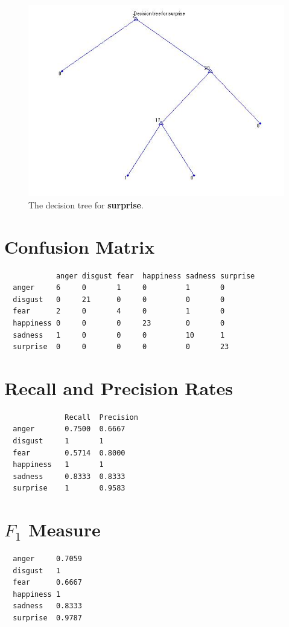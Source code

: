 \documentclass[a4paper,10pt]{article}
\begin{document}
\begin{figure}[h!]
	\centering
    \includegraphics[width=12cm]{surprise}
  \caption{The decision tree for \textbf{surprise}.}  
\end{figure}

\newpage

\section*{Confusion Matrix}
\begin{verbatim}
            anger disgust fear  happiness sadness surprise
  anger     6     0       1     0         1       0
  disgust   0     21      0     0         0       0
  fear      2     0       4     0         1       0
  happiness 0     0       0     23        0       0
  sadness   1     0       0     0         10      1
  surprise  0     0       0     0         0       23
\end{verbatim}

\section*{Recall and Precision Rates}
\begin{verbatim}
              Recall  Precision
  anger       0.7500  0.6667
  disgust     1       1
  fear        0.5714  0.8000
  happiness   1       1
  sadness     0.8333  0.8333
  surprise    1       0.9583
\end{verbatim}

\newpage

\section*{$F_1$ Measure}
\begin{verbatim}
  anger     0.7059
  disgust   1
  fear      0.6667
  happiness 1
  sadness   0.8333
  surprise  0.9787
\end{verbatim}
\end{document}
